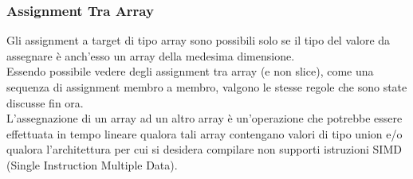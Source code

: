 \subsubsection{Assignment Tra Array}
Gli assignment a target di tipo array sono possibili solo se il tipo del valore da assegnare 
è anch'esso un array della medesima dimensione. \\

Essendo possibile vedere degli assignment tra array (e non slice), come una sequenza 
di assignment membro a membro, valgono le stesse regole che sono state discusse fin ora. \\

L'assegnazione di un array ad un altro array è un'operazione che potrebbe essere effettuata in 
tempo lineare qualora tali array contengano valori di tipo union e/o qualora l'architettura per 
cui si desidera compilare non supporti istruzioni SIMD (Single Instruction Multiple Data).